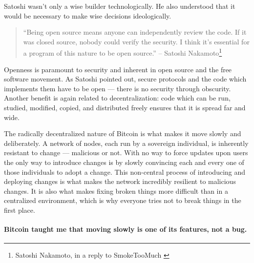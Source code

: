 Satoshi wasn't only a wise builder technologically. He also understood
that it would be necessary to make wise decisions ideologically.

\begin{quotation}
``Being open source means anyone can independently review the code. If
it was closed source, nobody could verify the security. I think it's
essential for a program of this nature to be open source.''
\flushright -- Satoshi Nakamoto\footnote{Satoshi Nakamoto, in a reply to SmokeTooMuch \cite{satoshi-open-source}}
\end{quotation}

Openness is paramount to security and inherent in open source and the
free software movement. As Satoshi pointed out, secure protocols and the
code which implements them have to be open --- there is no security
through obscurity. Another benefit is again related to decentralization:
code which can be run, studied, modified, copied, and distributed freely
ensures that it is spread far and wide.

The radically decentralized nature of Bitcoin is what makes it move
slowly and deliberately. A network of nodes, each run by a sovereign
individual, is inherently resistant to change --- malicious or not. With
no way to force updates upon users the only way to introduce changes is
by slowly convincing each and every one of those individuals to adopt a
change. This non-central process of introducing and deploying changes is
what makes the network incredibly resilient to malicious changes. It is
also what makes fixing broken things more difficult than in a
centralized environment, which is why everyone tries not to break things
in the first place.

\paragraph{Bitcoin taught me that moving slowly is one of its features, not a
bug.}

%
%
%
%
%
%
%

